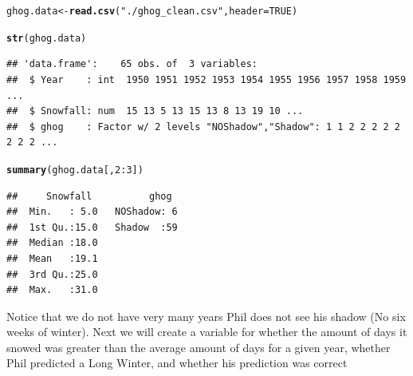 \documentclass[12pt]{article}\usepackage[]{graphicx}\usepackage[]{color}
\makeatletter
\newcommand{\hlnum}[1]{\textcolor[rgb]{0.686,0.059,0.569}{#1}}%
\newcommand{\hlstr}[1]{\textcolor[rgb]{0.192,0.494,0.8}{#1}}%
\newcommand{\hlopt}[1]{\textcolor[rgb]{0,0,0}{#1}}%
\newcommand{\hlstd}[1]{\textcolor[rgb]{0.345,0.345,0.345}{#1}}%
\newcommand{\hlkwb}[1]{\textcolor[rgb]{0.69,0.353,0.396}{#1}}%
\newcommand{\hlkwc}[1]{\textcolor[rgb]{0.333,0.667,0.333}{#1}}%
\newcommand{\hlkwd}[1]{\textcolor[rgb]{0.737,0.353,0.396}{\textbf{#1}}}%
\newenvironment{kframe}{%
 \def\at@end@of@kframe{}%
 \ifinner\ifhmode%
  \def\at@end@of@kframe{\end{minipage}}%
  \begin{minipage}{\columnwidth}%
 \fi\fi%
 \def\FrameCommand##1{\hskip\@totalleftmargin \hskip-\fboxsep
 \colorbox{shadecolor}{##1}\hskip-\fboxsep
     \hskip-\linewidth \hskip-\@totalleftmargin \hskip\columnwidth}%
 \MakeFramed {\advance\hsize-\width
   \@totalleftmargin\z@ \linewidth\hsize
   \@setminipage}}%
 {\par\unskip\endMakeFramed%
 \at@end@of@kframe}
\newenvironment{knitrout}{}{} %
\makeatother
\begin{document}
\begin{knitrout}
\color{fgcolor}\begin{kframe}
\begin{alltt}
\hlstd{ghog.data}\hlkwb{<-}\hlkwd{read.csv}\hlstd{(}\hlstr{"./ghog_clean.csv"}\hlstd{,}\hlkwc{header}\hlstd{=}\hlnum{TRUE}\hlstd{)}

\hlkwd{str}\hlstd{(ghog.data)}
\end{alltt}
\begin{verbatim}
## 'data.frame':	65 obs. of  3 variables:
##  $ Year    : int  1950 1951 1952 1953 1954 1955 1956 1957 1958 1959 ...
##  $ Snowfall: num  15 13 5 13 15 13 8 13 19 10 ...
##  $ ghog    : Factor w/ 2 levels "NOShadow","Shadow": 1 1 2 2 2 2 2 2 2 2 ...
\end{verbatim}
\begin{alltt}
\hlkwd{summary}\hlstd{(ghog.data[,}\hlnum{2}\hlopt{:}\hlnum{3}\hlstd{])}
\end{alltt}
\begin{verbatim}
##     Snowfall          ghog   
##  Min.   : 5.0   NOShadow: 6  
##  1st Qu.:15.0   Shadow  :59  
##  Median :18.0                
##  Mean   :19.1                
##  3rd Qu.:25.0                
##  Max.   :31.0
\end{verbatim}
\end{kframe}
\end{knitrout}
 
 Notice that we do not have very many years Phil does not see his shadow (No six weeks of winter). Next we will create a variable for whether the amount of days it snowed was greater than the average amount of days for a given year, whether Phil predicted a Long Winter, and whether his prediction was correct
 
\end{document}
